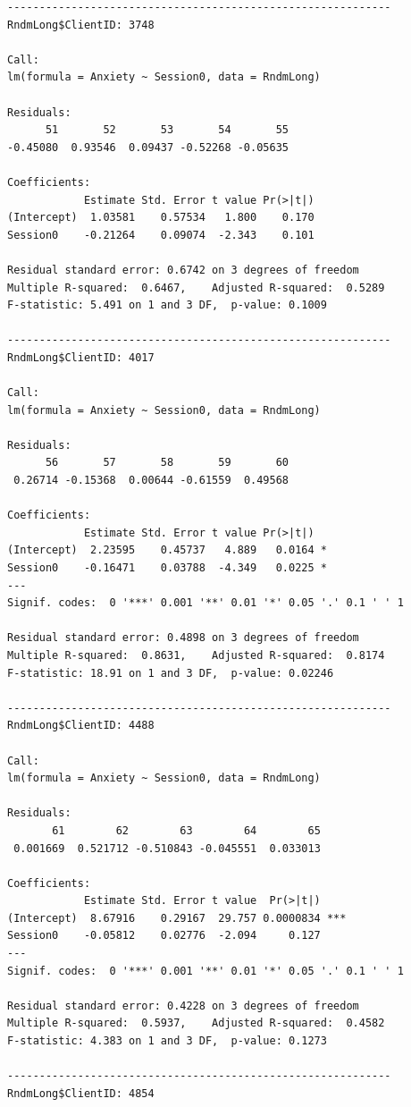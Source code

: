 \documentclass[
  english,
]{book}
\begin{document}
\begin{verbatim}
------------------------------------------------------------ 
RndmLong$ClientID: 3748

Call:
lm(formula = Anxiety ~ Session0, data = RndmLong)

Residuals:
      51       52       53       54       55 
-0.45080  0.93546  0.09437 -0.52268 -0.05635 

Coefficients:
            Estimate Std. Error t value Pr(>|t|)
(Intercept)  1.03581    0.57534   1.800    0.170
Session0    -0.21264    0.09074  -2.343    0.101

Residual standard error: 0.6742 on 3 degrees of freedom
Multiple R-squared:  0.6467,    Adjusted R-squared:  0.5289 
F-statistic: 5.491 on 1 and 3 DF,  p-value: 0.1009

------------------------------------------------------------ 
RndmLong$ClientID: 4017

Call:
lm(formula = Anxiety ~ Session0, data = RndmLong)

Residuals:
      56       57       58       59       60 
 0.26714 -0.15368  0.00644 -0.61559  0.49568 

Coefficients:
            Estimate Std. Error t value Pr(>|t|)  
(Intercept)  2.23595    0.45737   4.889   0.0164 *
Session0    -0.16471    0.03788  -4.349   0.0225 *
---
Signif. codes:  0 '***' 0.001 '**' 0.01 '*' 0.05 '.' 0.1 ' ' 1

Residual standard error: 0.4898 on 3 degrees of freedom
Multiple R-squared:  0.8631,    Adjusted R-squared:  0.8174 
F-statistic: 18.91 on 1 and 3 DF,  p-value: 0.02246

------------------------------------------------------------ 
RndmLong$ClientID: 4488

Call:
lm(formula = Anxiety ~ Session0, data = RndmLong)

Residuals:
       61        62        63        64        65 
 0.001669  0.521712 -0.510843 -0.045551  0.033013 

Coefficients:
            Estimate Std. Error t value  Pr(>|t|)    
(Intercept)  8.67916    0.29167  29.757 0.0000834 ***
Session0    -0.05812    0.02776  -2.094     0.127    
---
Signif. codes:  0 '***' 0.001 '**' 0.01 '*' 0.05 '.' 0.1 ' ' 1

Residual standard error: 0.4228 on 3 degrees of freedom
Multiple R-squared:  0.5937,    Adjusted R-squared:  0.4582 
F-statistic: 4.383 on 1 and 3 DF,  p-value: 0.1273

------------------------------------------------------------ 
RndmLong$ClientID: 4854


\end{verbatim}
\end{document}
